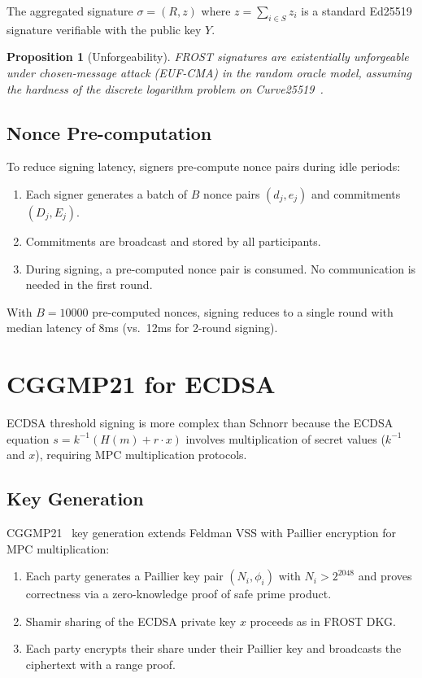 \documentclass[11pt]{article}
\newtheorem{proposition}[theorem]{Proposition}
\begin{document}
The aggregated signature $\sigma = (R, z)$ where $z = \sum_{i \in S} z_i$ is a
standard Ed25519 signature verifiable with the public key $Y$.

\begin{proposition}[Unforgeability]
FROST signatures are existentially unforgeable under chosen-message attack
(EUF-CMA) in the random oracle model, assuming the hardness of the discrete
logarithm problem on Curve25519~\cite{frost}.
\end{proposition}

\subsection{Nonce Pre-computation}

To reduce signing latency, signers pre-compute nonce pairs during idle periods:
\begin{enumerate}[leftmargin=1.4em]
    \item Each signer generates a batch of $B$ nonce pairs $(d_j, e_j)$ and
    commitments $(D_j, E_j)$.
    \item Commitments are broadcast and stored by all participants.
    \item During signing, a pre-computed nonce pair is consumed. No
    communication is needed in the first round.
\end{enumerate}

With $B = 10000$ pre-computed nonces, signing reduces to a single round with
median latency of 8ms (vs.\ 12ms for 2-round signing).

\section{CGGMP21 for ECDSA}
\label{sec:cggmp}

ECDSA threshold signing is more complex than Schnorr because the ECDSA
equation $s = k^{-1}(H(m) + r \cdot x)$ involves multiplication of secret
values ($k^{-1}$ and $x$), requiring MPC multiplication protocols.

\subsection{Key Generation}

CGGMP21~\cite{cggmp21} key generation extends Feldman VSS with Paillier
encryption for MPC multiplication:
\begin{enumerate}[leftmargin=1.4em]
    \item Each party generates a Paillier key pair $(N_i, \phi_i)$ with
    $N_i > 2^{2048}$ and proves correctness via a zero-knowledge proof of
    safe prime product.
    \item Shamir sharing of the ECDSA private key $x$ proceeds as in FROST DKG.
    \item Each party encrypts their share under their Paillier key and
    broadcasts the ciphertext with a range proof.
\end{enumerate}
\end{document}
